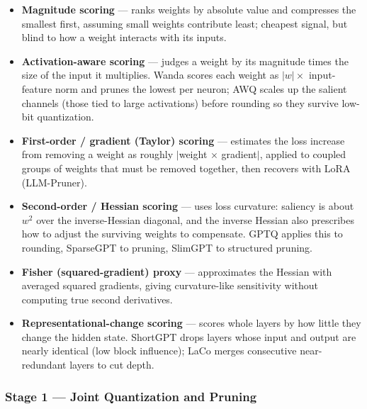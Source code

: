 \begin{itemize}

  \item \textbf{Magnitude scoring} --- ranks weights by absolute value and compresses the smallest first, assuming small weights contribute least; cheapest signal, but blind to how a weight interacts with its inputs.

  \item \textbf{Activation-aware scoring} \cite{lin2024awq,sun2024wanda} --- judges a weight by its magnitude times the size of the input it multiplies. Wanda scores each weight as $|w|\times$ input-feature norm and prunes the lowest per neuron; AWQ scales up the salient channels (those tied to large activations) before rounding so they survive low-bit quantization.

  \item \textbf{First-order / gradient (Taylor) scoring} \cite{ma2023llmpruner} --- estimates the loss increase from removing a weight as roughly $|$weight $\times$ gradient$|$, applied to coupled groups of weights that must be removed together, then recovers with LoRA (LLM-Pruner).

  \item \textbf{Second-order / Hessian scoring} \cite{frantar2023gptq,frantar2023sparsegpt,ling2024slimgpt} --- uses loss curvature: saliency is about $w^2$ over the inverse-Hessian diagonal, and the inverse Hessian also prescribes how to adjust the surviving weights to compensate. GPTQ applies this to rounding, SparseGPT to pruning, SlimGPT to structured pruning.

  \item \textbf{Fisher (squared-gradient) proxy} --- approximates the Hessian with averaged squared gradients, giving curvature-like sensitivity without computing true second derivatives.

  \item \textbf{Representational-change scoring} \cite{yang2024laco,men2024shortgpt} --- scores whole layers by how little they change the hidden state. ShortGPT drops layers whose input and output are nearly identical (low block influence); LaCo merges consecutive near-redundant layers to cut depth.

\end{itemize}

\subsubsection{Stage 1 --- Joint Quantization and Pruning}

